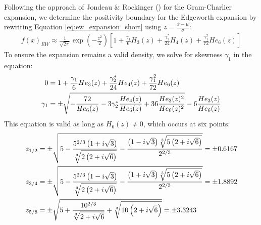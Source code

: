 Following the approach of Jondeau \& Rockinger (\citeyear{jondeauGramCharlierDensities2001}) for the Gram-Charlier expansion, we determine the positivity boundary for the Edgeworth expansion by rewriting Equation \eqref{eq:ew_expansion_short} using $z = \frac{x-\mu}{\sigma}$:
\begin{align}
    \label{eq:ew_expansion_s_ek}
    f(x)_{EW} \approx \frac{1}{\sqrt{2\pi}}\exp\left(-\frac{z^2}{2}\right) \left[1 + \frac{\gamma_1}{6}H_3(z) + \frac{\gamma_2^*}{24}H_4(z) + \frac{\gamma_1^2}{72}He_6(z)\right]
\end{align}
To ensure the expansion remains a valid density, we solve for skewness $\gamma_1$ in the equation:
\begin{align}
    0 &= 1+\frac{\gamma_1}{6}He_3(z) + \frac{\gamma_2^*}{24}He_4(z) + \frac{\gamma_1^2}{72}He_6(z) \\
    \gamma_1 &= \pm\sqrt{-\frac{72}{He_6(z)} - 3\gamma_2^*\frac{He_4(z)}{He_6(z)} + 36\frac{He_3(z)^2}{He_6(z)^2}} - 6\frac{He_3(z)}{He_6(z)} \notag
\end{align}
This equation is valid as long as $H_6(z) \neq 0$, which occurs at six points:
\begin{align}
    z_{1/2} &= \pm \sqrt{5-\frac{5^{2/3}\left(1+i\sqrt{3}\right)}{\sqrt[3]{2\left(2+i\sqrt{6}\right)}} - \frac{\left(1-i\sqrt{3}\right)\sqrt[3]{5\left(2+i\sqrt{6}\right)}}{2^{2/3}}} = \pm 0.6167 \notag\\
    z_{3/4} &= \pm \sqrt{5-\frac{5^{2/3}\left(1-i\sqrt{3}\right)}{\sqrt[3]{2\left(2+i\sqrt{6}\right)}} - \frac{\left(1+i\sqrt{3}\right)\sqrt[3]{5\left(2+i\sqrt{6}\right)}}{2^{2/3}}} = \pm 1.8892 \notag \\
    z_{5/6} &= \pm \sqrt{5+\frac{10^{2/3}}{\sqrt[3]{2+i\sqrt{6}}} + \sqrt[3]{10\left(2+i\sqrt{6}\right)}} = \pm 3.3243 \notag
\end{align}

